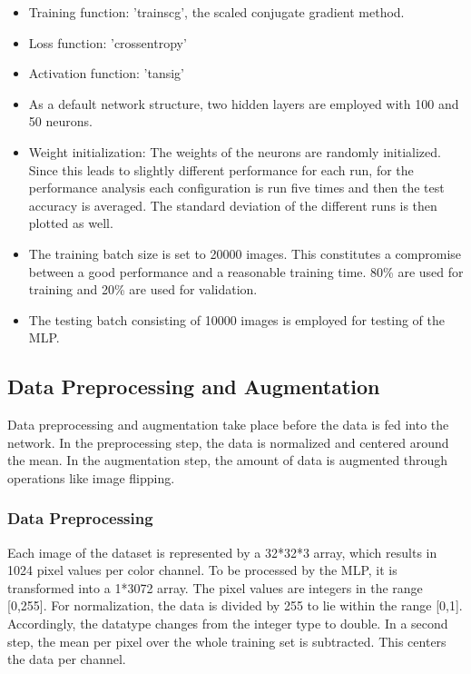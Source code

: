 \begin{itemize}
	\item Training function: 'trainscg', the scaled conjugate gradient method.

	\item Loss function: 'crossentropy'

	\item Activation function: 'tansig'
	
	\item As a default network structure, two hidden layers are employed with 100 and 50 neurons.

	\item Weight initialization: The weights of the neurons are randomly initialized. Since this leads to slightly different performance for each run, for the performance analysis each configuration is run five times and then the test accuracy is averaged. The standard deviation of the different runs is then plotted as well.
	
	\item The training batch size is set to 20000 images. This constitutes a compromise between a good performance and a reasonable training time. 80\% are used for training and 20\% are used for validation.

	\item The testing batch consisting of 10000 images is employed for testing of the MLP.
\end{itemize}

\FloatBarrier
\subsection{Data Preprocessing and Augmentation}\label{subsec:preProp}

Data preprocessing and augmentation take place before the data is fed into the network. In the preprocessing step, the data is normalized and centered around the mean. In the augmentation step, the amount of data is augmented through operations like image flipping.

\subsubsection{Data Preprocessing}\label{subsub:dataPreProp}

  	Each image of the dataset is represented by a 32*32*3 array, which results in 1024 pixel values per color channel. To be processed by the MLP, it is transformed into a 1*3072 array. The pixel values are integers in the range [0,255]. For normalization, the data is divided by 255 to lie within the range [0,1]. Accordingly, the datatype changes from the integer type to double. In a second step, the mean per pixel over the whole training set is subtracted. This centers the data per channel.

